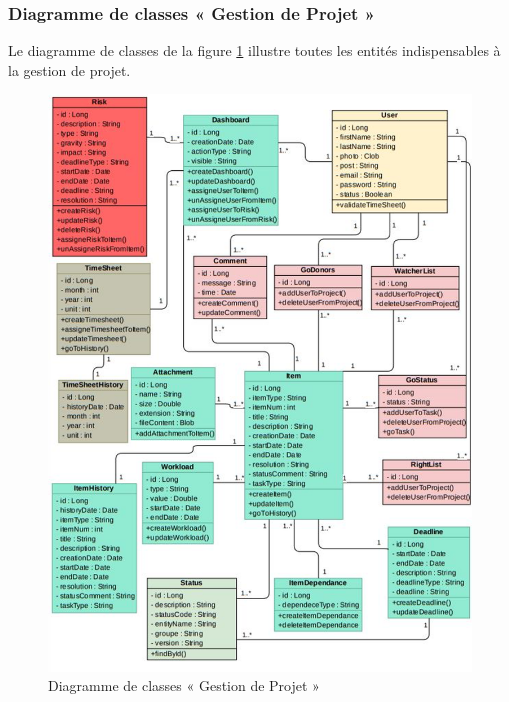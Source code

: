 \subsubsection{Diagramme de classes « Gestion de Projet »}
\hspace{4mm}Le diagramme de classes de la figure \ref{fig:class_P3} illustre toutes les entités indispensables à la gestion de projet. 
\begin{figure}[h]
    \centering
    \includegraphics[scale=0.84]{figures/33anis3.png}
    \caption{Diagramme de classes « Gestion de Projet »}
    \label{fig:class_P3}
\end{figure}\newpage
